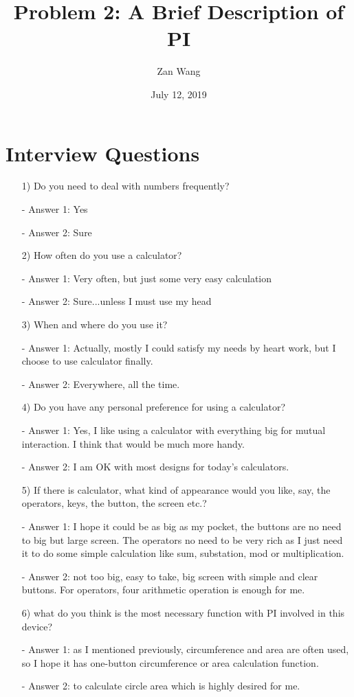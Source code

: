 \documentclass{article}
\title{Problem 2: A Brief Description of PI}
\author{Zan Wang}
\date{July 12, 2019}
\begin{document}
\maketitle

\section{Interview  Questions}
 \begin{itemize}

\item[1)] Do you need to deal with numbers frequently?
\item[-]Answer 1: Yes
\item[-] Answer 2: Sure 

\item[2)]How often do you use a calculator?
\item[-]Answer 1: Very often, but just some very easy calculation
\item[-]Answer 2: Sure...unless I must use my head

\item[3)]When and where do you use it?
\item[-]Answer 1: Actually, mostly I could satisfy my needs by heart work, but I choose to use calculator finally.
\item[-]Answer 2: Everywhere, all the time.

\item[4)]Do you have any personal preference for using a calculator?
\item[-]Answer 1: Yes, I like using a calculator with everything big for mutual interaction. I think that would be much more handy.
\item[-]Answer 2: I am OK with most designs for today's calculators.


\item[5)]If there is calculator, what kind of appearance would you like, say, the operators, keys, the button, the screen etc.?
\item[-]Answer 1: I hope it could be as big as my pocket, the buttons are no need to big but large screen. The operators no need to be very rich as I just need it to do some simple calculation like sum, substation, mod or multiplication. 
\item[-]Answer 2: not too big, easy to take, big screen with simple and clear buttons. For operators, four arithmetic operation is enough for me.


\item[6)]what do you think is the most necessary function with PI involved in this device?
\item[-]Answer 1: as I mentioned previously, circumference and area are often used, so I hope it has one-button circumference or area calculation function.
\item[-]Answer 2: to calculate circle area which is highly desired for me.



\end{itemize}
\end{document}
